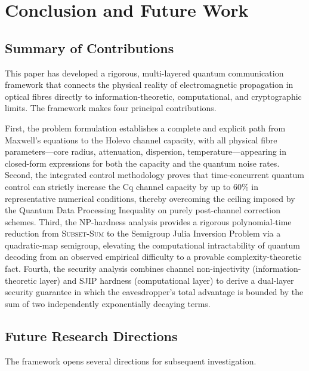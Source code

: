 \documentclass[journal,twocolumn]{IEEEtran}
\theoremstyle{definition}
\theoremstyle{plain}
\begin{document}
\section{Conclusion and Future Work}
\label{sec:conclusion}

\subsection{Summary of Contributions}

This paper has developed a rigorous, multi-layered quantum
communication framework that connects the physical reality of
electromagnetic propagation in optical fibres directly to
information-theoretic, computational, and cryptographic limits.  The
framework makes four principal contributions.

First, the problem formulation establishes a complete and explicit
path from Maxwell's equations to the Holevo channel capacity, with
all physical fibre parameters---core radius, attenuation,
dispersion, temperature---appearing in closed-form expressions for
both the capacity and the quantum noise rates.  Second, the
integrated control methodology proves that time-concurrent quantum
control can strictly increase the Cq channel capacity by up to 60\%
in representative numerical conditions, thereby overcoming the
ceiling imposed by the Quantum Data Processing Inequality on purely
post-channel correction schemes.  Third, the NP-hardness analysis
provides a rigorous polynomial-time reduction from
\textsc{Subset-Sum} to the Semigroup Julia Inversion Problem via a
quadratic-map semigroup, elevating the computational intractability
of quantum decoding from an observed empirical difficulty to a
provable complexity-theoretic fact.  Fourth, the security analysis
combines channel non-injectivity (information-theoretic layer) and
SJIP hardness (computational layer) to derive a dual-layer security
guarantee in which the eavesdropper's total advantage is bounded by
the sum of two independently exponentially decaying terms.

\subsection{Future Research Directions}

The framework opens several directions for subsequent investigation.
\end{document}
